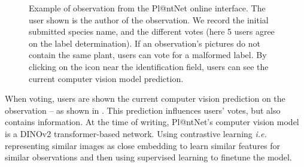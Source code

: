 \begin{figure}[H]
\begin{minipage}{.4\linewidth}
        \end{minipage}\par\medskip
            \caption{Example of observation from the Pl@ntNet online interface. The user shown is the author of the observation. We record the initial submitted species name, and the different votes (here 5 users agree on the label determination). If an observation's pictures do not contain the same plant, users can vote for a malformed label. By clicking on the icon near the identification field, users can see the current computer vision model prediction.}
    \label{fig:interface-plantnet}
\end{figure}

When voting, users are shown the current computer vision prediction on the observation -- as shown in . This prediction influences users' votes, but also contains information.
At the time of writing, Pl@ntNet's computer vision model is a DINOv2 \citep{oquab2024dinov2} transformer-based network.
Using contrastive learning \citep{waida2023understanding} \emph{i.e.} representing similar images as close embedding to learn similar features for similar observations and then using supervised learning to finetune the model.

